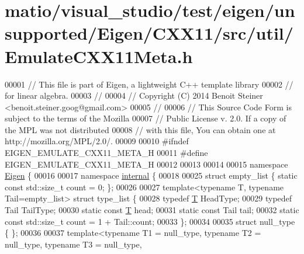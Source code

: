 \hypertarget{matio_2visual__studio_2test_2eigen_2unsupported_2_eigen_2_c_x_x11_2src_2util_2_emulate_c_x_x11_meta_8h_source}{}\section{matio/visual\+\_\+studio/test/eigen/unsupported/\+Eigen/\+C\+X\+X11/src/util/\+Emulate\+C\+X\+X11\+Meta.h}
\label{matio_2visual__studio_2test_2eigen_2unsupported_2_eigen_2_c_x_x11_2src_2util_2_emulate_c_x_x11_meta_8h_source}

\begin{DoxyCode}
00001 \textcolor{comment}{// This file is part of Eigen, a lightweight C++ template library}
00002 \textcolor{comment}{// for linear algebra.}
00003 \textcolor{comment}{//}
00004 \textcolor{comment}{// Copyright (C) 2014 Benoit Steiner <benoit.steiner.goog@gmail.com>}
00005 \textcolor{comment}{//}
00006 \textcolor{comment}{// This Source Code Form is subject to the terms of the Mozilla}
00007 \textcolor{comment}{// Public License v. 2.0. If a copy of the MPL was not distributed}
00008 \textcolor{comment}{// with this file, You can obtain one at http://mozilla.org/MPL/2.0/.}
00009 
00010 \textcolor{preprocessor}{#ifndef EIGEN\_EMULATE\_CXX11\_META\_H}
00011 \textcolor{preprocessor}{#define EIGEN\_EMULATE\_CXX11\_META\_H}
00012 
00013 
00014 
00015 \textcolor{keyword}{namespace }\hyperlink{namespace_eigen}{Eigen} \{
00016 
00017 \textcolor{keyword}{namespace }\hyperlink{namespaceinternal}{internal} \{
00018 
00025 \textcolor{keyword}{struct }empty\_list \{ \textcolor{keyword}{static} \textcolor{keyword}{const} std::size\_t count = 0; \};
00026 
00027 \textcolor{keyword}{template}<\textcolor{keyword}{typename} T, \textcolor{keyword}{typename} Tail=empty\_list> \textcolor{keyword}{struct }type\_list \{
00028   \textcolor{keyword}{typedef} \hyperlink{group___sparse_core___module_class_eigen_1_1_triplet}{T} HeadType;
00029   \textcolor{keyword}{typedef} Tail TailType;
00030   \textcolor{keyword}{static} \textcolor{keyword}{const} \hyperlink{group___sparse_core___module_class_eigen_1_1_triplet}{T} head;
00031   \textcolor{keyword}{static} \textcolor{keyword}{const} Tail tail;
00032   \textcolor{keyword}{static} \textcolor{keyword}{const} std::size\_t count = 1 + Tail::count;
00033 \};
00034 
00035 \textcolor{keyword}{struct }null\_type \{ \};
00036 
00037 \textcolor{keyword}{template}<\textcolor{keyword}{typename} T1 = null\_type, \textcolor{keyword}{typename} T2 = null\_type, \textcolor{keyword}{typename} T3 = null\_type,

\end{DoxyCode}
